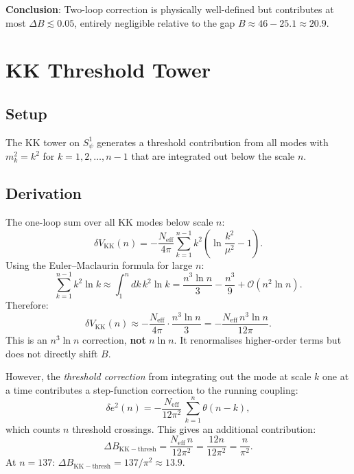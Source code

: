 \documentclass[11pt,a4paper]{article}
\begin{document}
\noindent
\textbf{Conclusion}: Two-loop correction is physically well-defined but
contributes at most $\Delta B \lesssim 0.05$, entirely negligible relative to the
gap $B \approx 46 - 25.1 \approx 20.9$.

\section{KK Threshold Tower}

\subsection{Setup}

The KK tower on $S^1_\psi$ generates a threshold contribution from all modes
with $m_k^2 = k^2$ for $k = 1, 2, \ldots, n-1$ that are integrated out below
the scale $n$.

\subsection{Derivation}

The one-loop sum over all KK modes below scale $n$:
\begin{equation}
  \delta V_\mathrm{KK}(n)
  = -\frac{N_\mathrm{eff}}{4\pi}\sum_{k=1}^{n-1} k^2
    \left(\ln\frac{k^2}{\mu^2} - 1\right).
\end{equation}
Using the Euler–Maclaurin formula for large $n$:
\begin{equation}
  \sum_{k=1}^{n-1} k^2 \ln k
  \approx \int_1^n dk\, k^2 \ln k
  = \frac{n^3\ln n}{3} - \frac{n^3}{9} + \mathcal{O}(n^2\ln n).
\end{equation}
Therefore:
\begin{equation}
  \delta V_\mathrm{KK}(n)
  \approx -\frac{N_\mathrm{eff}}{4\pi}\cdot\frac{n^3\ln n}{3}
  = -\frac{N_\mathrm{eff}\,n^3\ln n}{12\pi}.
\end{equation}
This is an $n^3\ln n$ correction, \textbf{not} $n\ln n$.
It renormalises higher-order terms but does not directly shift $B$.

However, the \emph{threshold correction} from integrating out the mode at scale $k$
one at a time contributes a step-function correction to the running coupling:
\begin{equation}
  \delta e^2(n) = -\frac{N_\mathrm{eff}}{12\pi^2}\,\sum_{k=1}^{n}\theta(n-k),
\end{equation}
which counts $n$ threshold crossings.  This gives an additional contribution:
\begin{equation}
  \Delta B_\mathrm{KK-thresh}
  = \frac{N_\mathrm{eff}\,n}{12\pi^2}
  = \frac{12n}{12\pi^2}
  = \frac{n}{\pi^2}.
\end{equation}
At $n = 137$: $\Delta B_\mathrm{KK-thresh} = 137/\pi^2 \approx 13.9$.
\end{document}
